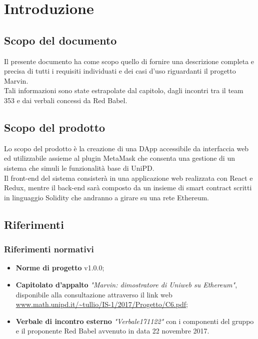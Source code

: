 \documentclass[AnalisiDeiRequisiti.tex]{subfiles}
\begin{document}
\chapter{Introduzione}
\section{Scopo del documento}
Il presente documento ha come scopo quello di fornire una descrizione completa e precisa di tutti i requisiti individuati e dei casi d'uso riguardanti il progetto Marvin.\\
Tali informazioni sono state estrapolate dal capitolo, dagli incontri tra il team 353 e dai verbali concessi da Red Babel.

\section{Scopo del prodotto}
Lo scopo del prodotto è la creazione di una DApp accessibile da interfaccia web ed utilizzabile assieme al plugin MetaMask che consenta una gestione di un sistema che simuli le funzionalità base di UniPD.\\
Il front-end del sistema consisterà in una applicazione web realizzata con React e Redux, mentre il back-end sarà composto da un insieme di smart contract scritti in linguaggio Solidity che andranno a girare su una rete Ethereum.\\

\section{Riferimenti}

\subsection{Riferimenti normativi}

\begin{itemize}
	\item \textbf{Norme di progetto} v1.0.0;\\
	\item \textbf{Capitolato d'appalto} \textit{"Marvin: dimostratore di Uniweb su Ethereum"}, disponibile alla consultazione attraverso il link web \url{www.math.unipd.it/~tullio/IS-1/2017/Progetto/C6.pdf};\\
	\item \textbf{Verbale di incontro esterno} \textit{"Verbale171122"} con i componenti del gruppo e il proponente Red Babel avvenuto in data 22 novembre 2017.
\end{itemize}
\end{document}
